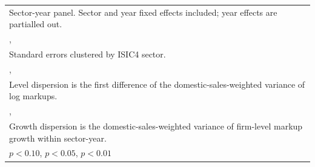 \begin{table}[htbp]
\begin{tabular}{l*{4}{c}}
\multicolumn{5}{l}{\footnotesize Sector-year panel. Sector and year fixed effects included; year effects are partialled out.}\\
\multicolumn{5}{l}{\footnotesize ,}\\
\multicolumn{5}{l}{\footnotesize Standard errors clustered by ISIC4 sector.}\\
\multicolumn{5}{l}{\footnotesize ,}\\
\multicolumn{5}{l}{\footnotesize Level dispersion is the first difference of the domestic-sales-weighted variance of log markups.}\\
\multicolumn{5}{l}{\footnotesize ,}\\
\multicolumn{5}{l}{\footnotesize Growth dispersion is the domestic-sales-weighted variance of firm-level markup growth within sector-year.}\\
\multicolumn{5}{l}{\footnotesize \sym{*} \(p<0.10\), \sym{**} \(p<0.05\), \sym{***} \(p<0.01\)}\\
\end{tabular}
\end{table}
